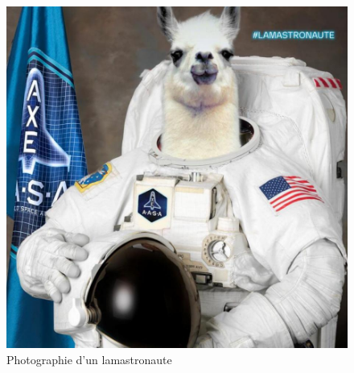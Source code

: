 \documentclass{article}
\begin{document}
\begin{figure}[h!!]
    \centering
    \caption{Photographie d'un lamastronaute}
    \includegraphics[scale=0.4]{lama.jpg}
\end{figure}
\end{document}
